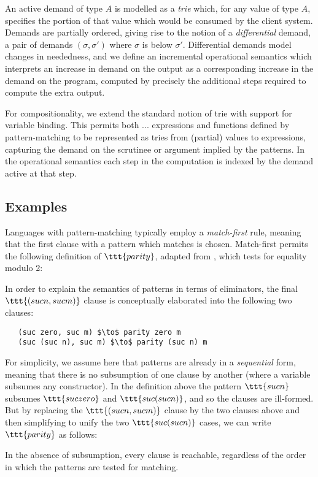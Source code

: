 An active demand of type $A$ is modelled as a \emph{trie}
\cite{hinze00} which, for any value of type $A$, specifies the portion
of that value which would be consumed by the client system. Demands
are partially ordered, giving rise to the notion of a
\emph{differential} demand, a pair of demands $(\sigma, \sigma')$
where $\sigma$ is below $\sigma'$. Differential demands model changes
in neededness, and we define an incremental operational semantics
which interprets an increase in demand on the output as a
corresponding increase in the demand on the program, computed by
precisely the additional steps required to compute the extra output.

For compositionality, we extend the standard notion of trie with support
for variable binding. This permits both ...
expressions and functions defined by pattern-matching to be represented
as tries from (partial) values to expressions, capturing the demand on
the scrutinee or argument implied by the patterns. In the operational
semantics each step in the computation is indexed by the demand active
at that step.

\subsection{Examples}

Languages with pattern-matching typically employ a \emph{match-first}
rule, meaning that the first clause with a pattern which matches is
chosen. Match-first permits the following definition of
$\ttt{parity}$, adapted from \cite{cockx14}, which tests for equality
modulo 2:



In order to explain the semantics of patterns in terms of eliminators,
the final $\ttt{(suc n, suc m)}$ clause is conceptually elaborated
into the following two clauses:

\begin{lstlisting}
   (suc zero, suc m) $\to$ parity zero m
   (suc (suc n), suc m) $\to$ parity (suc n) m
\end{lstlisting}

\noindent For simplicity, we assume here that patterns are already in
a \emph{sequential} form, meaning that there is no subsumption of one
clause by another (where a variable subsumes any constructor). In the
definition above the pattern $\ttt{suc n}$ subsumes $\ttt{suc zero}$
and $\ttt{suc (suc n)}$, and so the clauses are ill-formed. But by
replacing the $\ttt{(suc n, suc m)}$ clause by the two clauses above
and then simplifying to unify the two $\ttt{suc (suc n)}$ cases, we
can write $\ttt{parity}$ as follows:



\noindent In the absence of subsumption, every clause is reachable,
regardless of the order in which the patterns are tested for matching.
